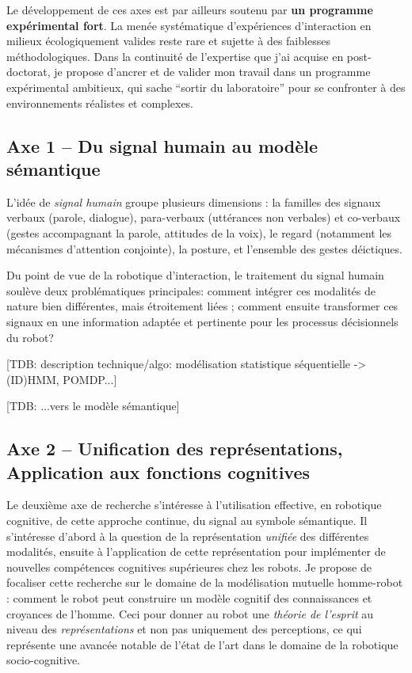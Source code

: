 \documentclass[a4paper]{article}
\begin{document}
Le développement de ces axes est par ailleurs soutenu par \textbf{un programme
expérimental fort}. La menée systématique d'expériences d'interaction en milieux
écologiquement valides reste rare et sujette à des faiblesses méthodologiques.
Dans la continuité de l'expertise que j'ai acquise en post-doctorat, je propose
d'ancrer et de valider mon travail dans un programme expérimental ambitieux, qui
sache ``sortir du laboratoire'' pour se confronter à des environnements
réalistes et complexes.

\subsection*{Axe 1 -- Du signal humain au modèle sémantique}

L'idée de \emph{signal humain} groupe plusieurs dimensions : la familles des
signaux verbaux (parole, dialogue), para-verbaux (uttérances non verbales) et
co-verbaux (gestes accompagnant la parole, attitudes de la voix), le regard
(notamment les mécanismes d'attention conjointe), la posture, et l'ensemble des
gestes déictiques.

Du point de vue de la robotique d'interaction, le traitement du signal humain
soulève deux problématiques principales: comment intégrer ces 
modalités de nature bien différentes, mais étroitement liées ; comment ensuite
transformer ces signaux en une information adaptée et pertinente pour les
processus décisionnels du robot?

[TDB: description technique/algo: modélisation statistique séquentielle ->
(ID)HMM, POMDP...]

[TDB: ...vers le modèle sémantique]

\subsection*{Axe 2 -- Unification des représentations, Application aux fonctions
cognitives}

Le deuxième axe de recherche s'intéresse à l'utilisation effective, en robotique
cognitive, de cette approche continue, du signal au symbole sémantique. Il
s'intéresse d'abord à la question de la représentation \emph{unifiée} des
différentes modalités, ensuite à l'application de cette représentation pour
implémenter de nouvelles compétences cognitives supérieures chez les robots. Je
propose de focaliser cette recherche sur le domaine de la modélisation mutuelle
homme-robot : comment le robot peut construire un modèle cognitif des
connaissances et croyances de l'homme. Ceci pour donner au robot une
\emph{théorie de l'esprit} au niveau des \emph{représentations} et non pas
uniquement des perceptions, ce qui représente une avancée notable de l'état de
l'art dans le domaine de la robotique socio-cognitive.
\end{document}
